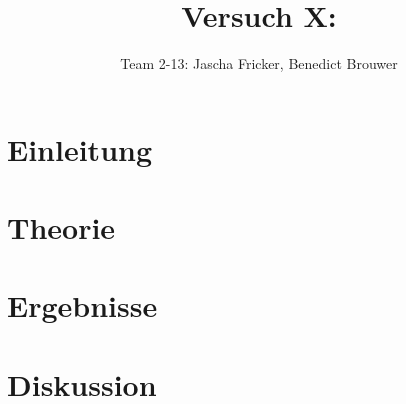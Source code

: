\documentclass[11pt, a4paper]{article}
\title{Versuch X: }
\author{Team 2-13: Jascha Fricker, Benedict Brouwer}
\begin{document}
    \maketitle

    \tableofcontents

    \newpage

    \section{Einleitung}

    \section{Theorie}

    \section{Ergebnisse}

    \section{Diskussion}

    
    
\end{document}
